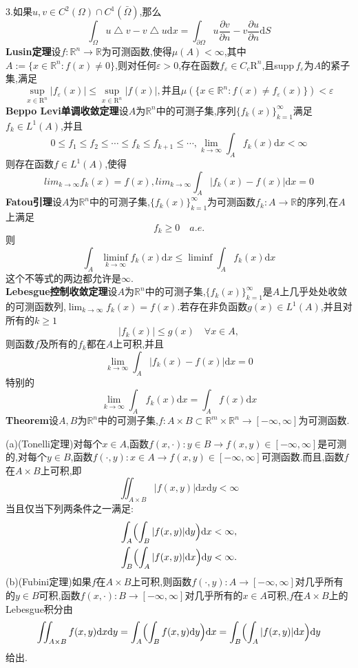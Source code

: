 \documentclass[a4paper,UTF8,12pt]{ctexart}
\begin{document}
3.如果$u,v\in C^2(\Omega )\cap C^1(\bar{\Omega})$,那么
$$
\int_\Omega u\bigtriangleup v-v\bigtriangleup u\mathrm{d}x = \int_{\partial \Omega}u\frac{\partial v}{\partial n}-v\frac{\partial u}{\partial n}\mathrm{d}S
$$
\textbf{Lusin定理}\quad 设$f:\mathbb{R}^n\to \mathbb{R}$为可测函数,使得$\mu (A)<\infty$,其中$A:=\{x\in \mathbb{R}^n:f(x)\neq 0\}$,则对任何$\varepsilon >0$,存在函数$f_{\varepsilon}\in C_c{\mathrm{R}^n}$,且supp\,$f_{\varepsilon}$为$A$的紧子集,满足
$$
\sup_{x\in\mathrm{R}^n}|f_{\varepsilon}(x)|\leqslant \sup_{x\in\mathrm{R}^n}|f(x)|,\text{并且}\mu(\{x\in \mathbb{R}^n:f(x)\neq f_{\varepsilon}(x)\})<\varepsilon
$$
\textbf{Beppo Levi单调收敛定理}\quad 设$A$为$\mathbb{R}^n$中的可测子集,序列$\{f_k(x)\}^\infty _{k=1}$满足$f_{k}\in L^1(A)$,并且
$$
0\leqslant f_1\leqslant f_2\leqslant \cdots\leqslant f_k\leqslant f_{k+1}\leqslant\cdots ,\lim_{k\to \infty}\int_{A}f_k(x)\mathrm{d}x<\infty
$$
则存在函数$f\in L^1(A)$,使得
$$
lim_{k\to \infty}f_k(x)=f(x),lim_{k\to \infty}\int_{A}|f_k(x)-f(x)|\mathrm{d}x=0
$$
\textbf{Fatou引理}\quad 设$A$为$\mathbb{R}^n$中的可测子集,$\{f_k(x)\}^\infty _{k=1}$为可测函数$f_k:A\to \mathbb{R}$的序列,在$A$上满足
$$
f_k\geqslant 0\quad a.e.
$$
则
$$
\int_A\liminf_{k\to \infty}f_k(x)\mathrm{d}x\leqslant\liminf\int_Af_k(x)\mathrm{d}x
$$
这个不等式的两边都允许是$\infty$.\\
\textbf{Lebesgue控制收敛定理}\quad 设$A$为$\mathbb{R}^n$中的可测子集,$\{f_k(x)\}^\infty _{k=1}$是$A$上几乎处处收敛的可测函数列,$\lim_{k\to \infty}f_k(x)=f(x)$.若存在非负函数$g(x)\in L^1(A)$,并且对所有的$k\geqslant 1$
$$
|f_k(x)|\leqslant g(x)\quad \forall x\in A,
$$
则函数$f$及所有的$f_k$都在$A$上可积,并且
$$
\lim_{k\to \infty}\int_A|f_k(x)-f(x)|\mathrm{d}x=0
$$
特别的
$$
\lim_{k\to \infty}\int_Af_k(x)\mathrm{d}x=\int_Af(x)\mathrm{d}x
$$
\textbf{Theorem}\quad 设$A,B$为$\mathbb{R}^n$中的可测子集,$f:A\times B\subset \mathbb{R}^m\times\mathbb{R}^n\to [-\infty,\infty]$为可测函数.\par
(a)(Tonelli定理)\quad 对每个$x\in A$,函数$f(x,\cdot):y\in B\to f(x,y)\in [-\infty,\infty]$是可测的,对每个$y\in B$,函数$f(\cdot,y):x\in A\to f(x,y)\in [-\infty,\infty]$可测函数.而且,函数$f$在$A\times B$上可积,即
$$
\iint _{A\times B}|f(x,y)|\mathrm{d}x\mathrm{d}y<\infty
$$
当且仅当下列两条件之一满足:
$$
\begin{aligned}
    \int_A\Bigl(\int_B|f(x,y)|\mathrm{d}y\Bigr)\mathrm{d}x &<\infty,\\
    \int_B\Bigl(\int_A|f(x,y)|\mathrm{d}x\Bigr)\mathrm{d}y &<\infty.\\
\end{aligned}
$$
\quad \quad (b)(Fubini定理)\quad 如果$f$在$A\times B$上可积,则函数$f(\cdot,y):A\to [-\infty,\infty]$对几乎所有的$y\in B$可积,函数$f(x,\cdot):B\to [-\infty,\infty]$对几乎所有的$x\in A$可积,$f$在$A\times B$上的Lebesgue积分由
$$
\iint _{A\times B}f(x,y)\mathrm{d}x\mathrm{d}y=\int_A\Bigl(\int_Bf(x,y)\mathrm{d}y\Bigr)\mathrm{d}x=\int_B\Bigl(\int_A|f(x,y)|\mathrm{d}x\Bigr)\mathrm{d}y
$$
给出.
\end{document}
